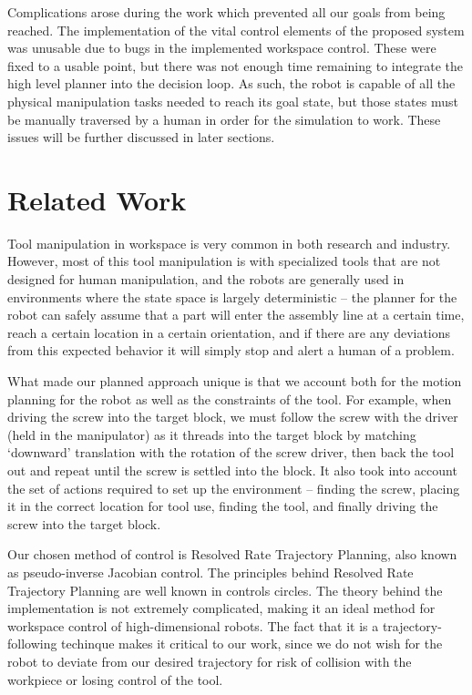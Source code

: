 \documentclass[10pt, conference]{IEEEtran}
\begin{document}
  Complications arose during the work which prevented all our goals from
  being reached. The implementation of the vital control elements of the
  proposed system was unusable due to bugs in the implemented workspace
  control. These were fixed to a usable point, but there was not enough
  time remaining to integrate the high level planner into the decision
  loop. As such, the robot is capable of all the physical manipulation
  tasks needed to reach its goal state, but those states must be
  manually traversed by a human in order for the simulation to
  work. These issues will be further discussed in later sections.
\section{Related Work}
\label{sec-2}

  Tool manipulation in workspace is very common in both research and
  industry. However, most of this tool manipulation is with specialized
  tools that are not designed for human manipulation, and the robots are
  generally used in environments where the state space is largely
  deterministic -- the planner for the robot can safely assume that a
  part will enter the assembly line at a certain time, reach a certain
  location in a certain orientation, and if there are any deviations
  from this expected behavior it will simply stop and alert a human of a
  problem.

  What made our planned approach unique is that we account both for the
  motion planning for the robot as well as the constraints of the
  tool. For example, when driving the screw into the target block, we
  must follow the screw with the driver (held in the manipulator) as it
  threads into the target block by matching `downward' translation with
  the rotation of the screw driver, then back the tool out and repeat
  until the screw is settled into the block. It also took into account
  the set of actions required to set up the environment -- finding the
  screw, placing it in the correct location for tool use, finding the
  tool, and finally driving the screw into the target block.

  Our chosen method of control is Resolved Rate Trajectory Planning,
  also known as pseudo-inverse Jacobian control. The principles behind
  Resolved Rate Trajectory Planning are well known in controls
  circles. The theory behind the implementation is not extremely
  complicated, making it an ideal method for workspace control of
  high-dimensional robots.\cite{survey_ik} The fact that it is a
  trajectory-following techinque makes it critical to our work, since we
  do not wish for the robot to deviate from our desired trajectory for
  risk of collision with the workpiece or losing control of the tool.
\end{document}
